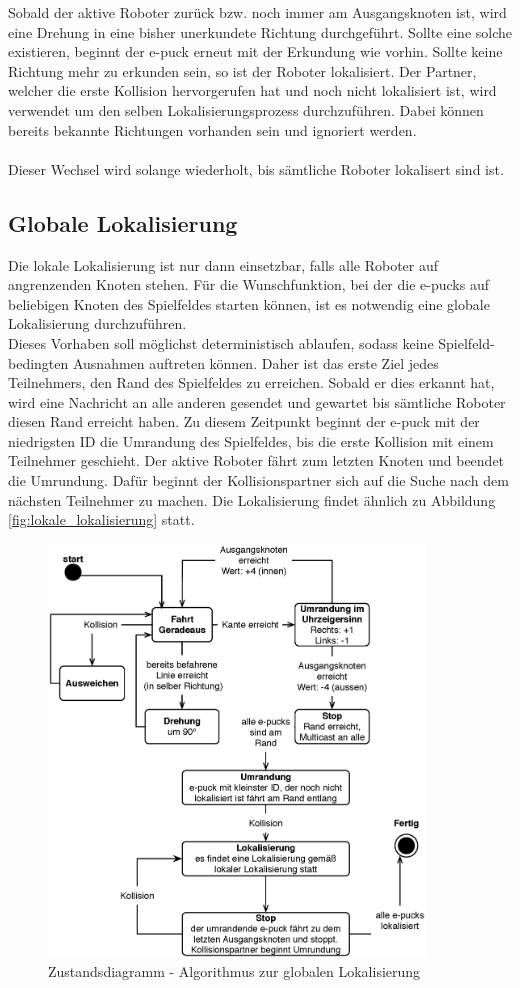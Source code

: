 \documentclass[10pt,a4paper]{article}
\begin{document}
			Sobald der aktive Roboter zurück bzw. noch immer am Ausgangsknoten ist, wird eine Drehung in eine bisher unerkundete Richtung
			durchgeführt. Sollte eine solche existieren, beginnt der e-puck erneut mit der Erkundung wie vorhin. Sollte keine Richtung mehr zu
			erkunden sein, so ist der Roboter lokalisiert. Der Partner, welcher die erste Kollision hervorgerufen hat und noch nicht lokalisiert ist,
			wird verwendet um den selben Lokalisierungsprozess durchzuführen. Dabei können bereits bekannte Richtungen vorhanden sein und
			ignoriert werden.\\ \\
			Dieser Wechsel wird solange wiederholt, bis sämtliche Roboter lokalisert sind ist.
		\subsection{Globale Lokalisierung}
			Die lokale Lokalisierung ist nur dann einsetzbar, falls alle Roboter auf angrenzenden Knoten stehen. Für die Wunschfunktion,
			bei der die e-pucks auf beliebigen Knoten des Spielfeldes starten können, ist es notwendig eine globale Lokalisierung
			durchzuführen. \\
			Dieses Vorhaben soll möglichst deterministisch ablaufen, sodass keine Spielfeld-bedingten Ausnahmen auftreten können. Daher ist das
			erste Ziel jedes Teilnehmers, den Rand des Spielfeldes zu erreichen. Sobald er dies erkannt hat, wird eine Nachricht an alle anderen
			gesendet und gewartet bis sämtliche Roboter diesen Rand erreicht haben. Zu diesem Zeitpunkt beginnt der e-puck mit der niedrigsten
			ID die Umrandung des Spielfeldes, bis die erste Kollision mit einem Teilnehmer geschieht. Der aktive Roboter fährt zum letzten Knoten
			und beendet die Umrundung. Dafür beginnt der Kollisionspartner sich auf die Suche nach dem nächsten Teilnehmer zu machen. Die 
			Lokalisierung findet ähnlich zu Abbildung \ref{fig:lokale_lokalisierung} statt.
		 	\begin{figure}[h]
				\centering
				\includegraphics[width=10cm]{images/globale_lokalisierung.eps}
  				\caption{Zustandsdiagramm - Algorithmus zur globalen Lokalisierung}
  				\label{fig:globale_lokalisierung}
  			\end{figure}
\end{document}
